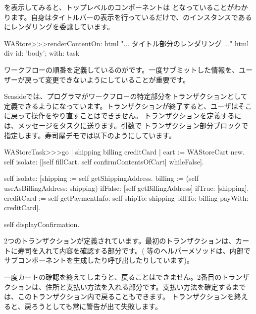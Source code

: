 \documentclass[a4paper,10pt,twoside]{book}
\begin{document}
 を表示してみると、トップレベルのコンポーネントは となっていることがわかります。自身はタイトルバーの表示を行っているだけで、のインスタンスである にレンダリングを委譲しています。

\begin{code}{}
WAStore>>>renderContentOn: html
	"... タイトル部分のレンダリング ..."
	html div id: 'body'; with: task
\end{code}

ワークフローの順番を定義しているのがです。一度サブミットした情報を、ユーザーが戻って変更できないようにしていることが重要です。


Seasideでは、プログラマがワークフローの特定部分をトランザクションとして定義できるようになっています。トランザクションが終了すると、ユーザはそこに戻って操作をやり直すことはできません。
トランザクションを定義するには、メッセージをタスクに送ります。引数で
トランザクション部分ブロックで指定します。寿司屋デモでは以下のようにしています。

\begin{code}{}
WAStoreTask>>>go
	| shipping billing creditCard |
	cart := WAStoreCart new.
	self isolate:
		[[self fillCart.
		self confirmContentsOfCart]
			whileFalse].

	self isolate:
		[shipping := self getShippingAddress.
		billing := (self useAsBillingAddress: shipping)
					ifFalse: [self getBillingAddress]
					ifTrue: [shipping].
		creditCard := self getPaymentInfo.
		self shipTo: shipping billTo: billing payWith: creditCard].

	self displayConfirmation.
\end{code}

2つのトランザクションが定義されています。最初のトランザクションは、カートに寿司を入れて内容を確認する部分です。(  等のヘルパーメソッドは、内部でサブコンポーネントを生成したり呼び出したりしています)。

一度カートの確認を終えてしまうと、戻ることはできません。2番目のトランザクションは、住所と支払い方法を入れる部分です。支払い方法を確定するまでは、このトランザクション内で戻ることもできます。
トランザクションを終えると、戻ろうとしても常に警告が出て失敗します。
\end{document}
